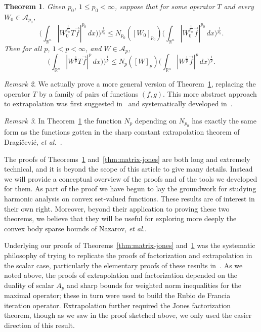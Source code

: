 \documentclass[12pt]{amsart}
\newtheorem{theorem}{Theorem}[section]
\theoremstyle{definition}
\theoremstyle{remark}
\newtheorem{remark}[theorem]{Remark}
\numberwithin{equation}{section}
\newcommand{\A}{\mathcal A}
\newcommand{\vecf}{\vec{f}}
\begin{document}
\medskip

\begin{theorem} \label{thm:matrix-rubio}
Given $p_0$, $1\leq p_0<\infty$, suppose that for some operator $T$ and every $W_0\in
      \A_{p_0}$,
      \[ \bigg(\int_{\mathbb R^n} |W_0^{\frac{1}{p_0}}
        T\vecf|^{p_0} \,dx)\bigg)^{\frac{1}{p_0}}
        \leq N_{p_0}([W_0]_{p_0})\bigg( \int_{\mathbb R^n}
        |W_0^{\frac{1}{p_0}} \vecf|^{p_0}
        \,dx \bigg)^{\frac{1}{p_0}}.\]
      Then for all $p$, $1<p<\infty$, and $W\in \A_p$,
      \[ \bigg(\int_{\mathbb R^n}
        |W^{\frac{1}{p}} T\vecf|^{p}\,dx)\bigg)^{\frac{1}{p}}
        \leq N_{p}([W]_{p})\bigg( \int_{\mathbb R^n}
        |W^{\frac{1}{p}} \vecf|^{p}
        \,dx \bigg)^{\frac{1}{p}}.\]
\end{theorem}

\smallskip

\begin{remark}
  We actually prove a more general version of
  Theorem~\ref{thm:matrix-rubio}, replacing the operator
  $T$ by a family of pairs of functions $(f,g)$.  This more abstract
  approach to extrapolation was first suggested
  in~\cite{cruz-uribe-perez00} and systematically developed
  in~\cite{cruz-martell-perezBook}.
\end{remark}

\begin{remark}
  In Theorem~\ref{thm:matrix-rubio} the function $N_p$
  depending on $N_{p_0}$ has exactly the same form as the functions
  gotten in the sharp constant extrapolation theorem of
  Dragi{\v{c}}evi{\'c}, {\em et al.}~\cite{MR2140200}.  
\end{remark}


\medskip



The proofs of Theorems~\ref{thm:matrix-rubio}
and~\ref{thm:matrix-jones} are both long and extremely technical, and
it is beyond the scope of this article to give many details.  Instead
we will provide a conceptual overview of the proofs and of the tools
we developed for them.  As part of the proof we have begun to lay the
groundwork for studying harmonic analysis on convex set-valued
functions.  These results are of interest in their own right.
Moreover, beyond their application to proving these two theorems, we
believe that they will be useful for exploring more deeply the convex
body sparse bounds of Nazarov, {\em et al.}.

Underlying our proofs of Theorems~\ref{thm:matrix-jones}
and~\ref{thm:matrix-rubio} was the systematic philosophy of trying to
replicate the proofs of factorization and extrapolation in the scalar
case, particularly the elementary proofs of these results
in~\cite{cruz-martell-perezBook,dcu-paseky}.  As we noted above, the
proofs of extrapolation and factorization depended on
the duality of scalar  $A_p$ and sharp bounds for weighted norm
inequalities for the maximal operator; these in turn were used to
build the Rubio de Francia iteration operator.   Extrapolation further
required the Jones factorization theorem, though as we saw in the
proof sketched above, we only used the easier direction of this
result.
\end{document}
